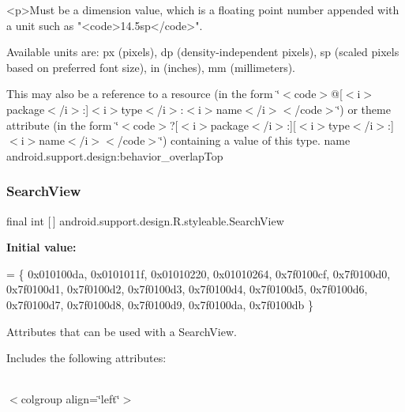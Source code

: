 \begin{DoxyVerb}      <p>Must be a dimension value, which is a floating point number appended with a unit such as "<code>14.5sp</code>".
\end{DoxyVerb}
 Available units are\+: px (pixels), dp (density-\/independent pixels), sp (scaled pixels based on preferred font size), in (inches), mm (millimeters). 

This may also be a reference to a resource (in the form \char`\"{}$<$code$>$@\mbox{[}$<$i$>$package$<$/i$>$\+:\mbox{]}$<$i$>$type$<$/i$>$\+:$<$i$>$name$<$/i$>$$<$/code$>$\char`\"{}) or theme attribute (in the form \char`\"{}$<$code$>$?\mbox{[}$<$i$>$package$<$/i$>$\+:\mbox{]}\mbox{[}$<$i$>$type$<$/i$>$\+:\mbox{]}$<$i$>$name$<$/i$>$$<$/code$>$\char`\"{}) containing a value of this type.  name android.\+support.\+design\+:behavior\+\_\+overlap\+Top \mbox{\label{classandroid_1_1support_1_1design_1_1R_1_1styleable_a8f7e72dc1bf854e14c1be7dbc1cb7392}} 
\subsubsection{\texorpdfstring{Search\+View}{SearchView}}
{\footnotesize\ttfamily final int \mbox{[}$\,$\mbox{]} android.\+support.\+design.\+R.\+styleable.\+Search\+View\hspace{0.3cm}{\ttfamily [static]}}

{\bfseries Initial value\+:}
\begin{DoxyCode}
= \{
            0x010100da, 0x0101011f, 0x01010220, 0x01010264,
            0x7f0100cf, 0x7f0100d0, 0x7f0100d1, 0x7f0100d2,
            0x7f0100d3, 0x7f0100d4, 0x7f0100d5, 0x7f0100d6,
            0x7f0100d7, 0x7f0100d8, 0x7f0100d9, 0x7f0100da,
            0x7f0100db
        \}
\end{DoxyCode}
Attributes that can be used with a Search\+View. 

Includes the following attributes\+:

\tabulinesep=1mm
\begin{longtabu} spread 0pt [c]{*{0}{|X[-1]}|}
\hline
\end{longtabu}
$<$colgroup align=\char`\"{}left\char`\"{}$>$ 

